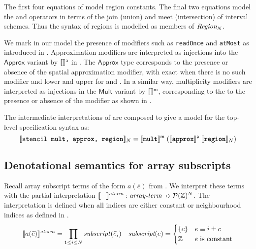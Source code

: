 The first four equations of  model region 
constants. The final two equations model the \term{+} and \term{*}
operators in terms of the join (union) and meet (intersection)
of interval schemes. Thus the syntax of regions is modelled as members 
of $\textnormal{$\textit{Region}_{N}$}$.

We mark in our model the presence of modifiers such as
\texttt{readOnce} and \texttt{atMost} as introduced in .
Approximation modifiers are interpreted as injections into the
$\mathsf{Approx}$ variant by $\llbracket{} {} \rrbracket{}^{\textsf{a}}$ in
.  The $\textsf{Approx}$ type corresponds
to the presence or absence of the spatial approximation modifier, with
\textsf{exact} when there is no such modifier and \textsf{lower} and
\textsf{upper} for  and . In a similar way,
multiplicity modifiers are interpreted as injections in the
$\mathsf{Mult}$ variant by $\llbracket{} {} \rrbracket{}^{\textsf{m}}$, corresponding to the to
the presence or absence of the  modifier as shown in
.

\begin{defn}
The intermediate interpretations of 
are composed to give a model for the top-level specification
syntax as:
%
\begin{equation*}
  \llbracket{} {\texttt{stencil \texttt{\textbf{mult}}, \texttt{\textbf{approx}}, \texttt{\textbf{region}}}} \rrbracket{}_N =
    \llbracket{} {\texttt{\textbf{mult}}} \rrbracket{}^{\textsf{m}} \;
           {(\llbracket{} {\texttt{\textbf{approx}}} \rrbracket{}^{\textsf{a}} \;
                    {\llbracket{} {\texttt{\textbf{region}}} \rrbracket{}_N)}}
\end{equation*}
\end{defn}

\subsection{Denotational semantics for array subscripts}
\label{sec:fromcode}

\begin{defn}
  Recall array subscript terms of the form $a(\bar{e})$ from
  . We interpret these terms with the partial
  interpretation $\interp{-}^{\mathit{aterm}} : \textit{array-term}
  \prightarrow{} \mathcal{P}(\bz{})^N$. The interpretation is defined when
  all indices are either constant or neighbourhood indices as defined in
  .
%
  \begin{align*}
    \llbracket{} {a(\bar{e})} \rrbracket{}^{\mathit{aterm}} =
      \prod_{1 \leq i \leq N} \mathit{subscript}(\bar{e}_i) & &
    \textit{subscript}(e) = \begin{cases}
      \{ c \} & e \equiv i \pm c \\
      \textnormal{$\mathbb{Z}$} & e \; \mbox{is constant}
    \end{cases}
  \end{align*}
\end{defn}


